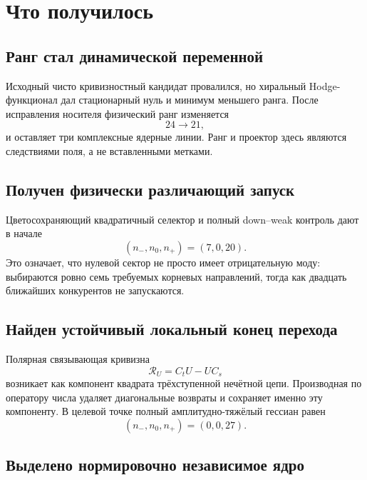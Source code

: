 \section{Что получилось}

\subsection{Ранг стал динамической переменной}

Исходный чисто кривизностный кандидат провалился, но хиральный
Hodge-функционал дал стационарный нуль и минимум меньшего ранга. После
исправления носителя физический ранг изменяется
\begin{equation}
 24\longrightarrow21,
\end{equation}
и оставляет три комплексные ядерные линии. Ранг и проектор здесь являются
следствиями поля, а не вставленными метками.

\subsection{Получен физически различающий запуск}

Цветосохраняющий квадратичный селектор и полный down--weak контроль дают
в начале
\begin{equation}
 (n_-,n_0,n_+)=(7,0,20).
\end{equation}
Это означает, что нулевой сектор не просто имеет отрицательную моду:
выбираются ровно семь требуемых корневых направлений, тогда как двадцать
ближайших конкурентов не запускаются.

\subsection{Найден устойчивый локальный конец перехода}

Полярная связывающая кривизна
\begin{equation}
 \mathcal R_U=C_tU-UC_s
\end{equation}
возникает как компонент квадрата трёхступенной нечётной цепи. Производная
по оператору числа удаляет диагональные возвраты и сохраняет именно эту
компоненту. В целевой точке полный амплитудно-тяжёлый гессиан равен
\begin{equation}
 (n_-,n_0,n_+)=(0,0,27).
\end{equation}

\subsection{Выделено нормировочно независимое ядро}

